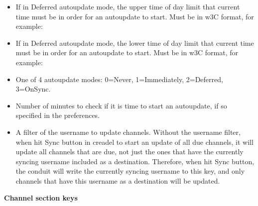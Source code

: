 \begin{helponly}
\begin{itemize}
  \item {} If in Deferred
    autoupdate mode, the upper time of day limit that current time must be
    in order for an autoupdate to start. Must be in w3C format, for example:
  \item {} If in Deferred
    autoupdate mode, the lower time of day limit that current time must be
    in order for an autoupdate to start. Must be in w3C format, for example:
  \item {} One of 4 autoupdate modes: 0=Never,
    1=Immediately, 2=Deferred, 3=OnSync.
  \item {} Number of minutes to check if it is time
    to start an autoupdate, if so specified in the preferences.
  \item {} A filter of the username to update channels.
    Without the username filter, when hit Sync button in creadel to start an 
    update of all due channels, it will update all channels that are due,
    not just the ones that have the currently syncing username included as a
    destination. Therefore, when hit Sync button, the conduit will write the 
    currently syncing username to this key, and only channels that have this
    username as a destination will be updated. \notimplemented
\end{itemize}

\bf{Channel section keys}


\end{helponly}
